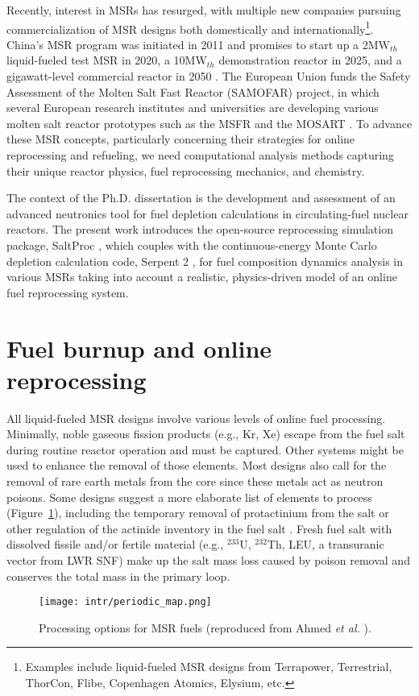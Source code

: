 Recently, interest in \glspl{MSR} has resurged, with multiple new companies 
pursuing commercialization of \gls{MSR} designs both domestically and 
internationally\footnote{Examples include liquid-fueled \gls{MSR} designs from 
Terrapower, Terrestrial, ThorCon, Flibe, Copenhagen Atomics, Elysium, etc.}. 
China's \gls{MSR} program was initiated in 2011 and promises to start up a  
2MW$_{th}$ liquid-fueled test \gls{MSR} in 2020, a 10MW$_{th}$ demonstration 
reactor in 2025, and a gigawatt-level 
commercial reactor in 2050 \cite{zhang_review_2018}. The European 
Union funds the Safety Assessment of the Molten Salt Fast Reactor 
(SAMOFAR) project, in which several European research institutes and 
universities are developing various molten salt reactor prototypes 
such as the \gls{MSFR} \cite{fiorina_molten_2013} and the \gls{MOSART} 
\cite{ignatiev_molten_2014}. To advance these \gls{MSR} concepts, particularly 
concerning their strategies for online reprocessing and refueling, we need 
computational analysis methods capturing their unique reactor 
physics, fuel reprocessing mechanics, and chemistry.

The context of the Ph.D. dissertation is the development and assessment of an 
advanced neutronics tool for fuel depletion calculations in circulating-fuel 
nuclear reactors. The present work introduces the open-source reprocessing 
simulation package, SaltProc \cite{rykhlevskii_arfc/saltproc_2018}, which 
couples with the continuous-energy Monte Carlo depletion calculation code, 
Serpent 2 \cite{leppanen_serpent_2014}, for fuel composition dynamics analysis 
in various \glspl{MSR} taking into account a realistic, physics-driven
model of an online fuel reprocessing system.

\section{Fuel burnup and online reprocessing}\label{sec:litreview}
All liquid-fueled \gls{MSR} designs involve various levels of online fuel 
processing. Minimally, noble gaseous fission products (e.g., Kr, Xe) 
escape from the fuel salt during routine reactor operation and must be 
captured. Other systems might be used to enhance the removal of those 
elements. Most designs also call for the removal of rare earth metals from 
the core since these metals act as neutron poisons. Some designs suggest a 
more elaborate list of elements to process (Figure~\ref{fig:periodic_tab}), 
including the temporary removal of protactinium from the salt or other 
regulation of the actinide inventory in the fuel salt 
\cite{ahmad_neutronics_2015}. Fresh fuel salt with dissolved fissile and/or 
fertile material (e.g., $^{233}$U, $^{232}$Th, \gls{LEU}, a transuranic 
vector from \gls{LWR} \gls{SNF}) make up the salt mass loss caused by poison 
removal and conserves the total mass in the primary loop.
\begin{figure}[htp!] %
	\centering
	\texttt{[image: intr/periodic\_map.png]}
	\caption{Processing options for \gls{MSR} fuels (reproduced from 
		Ahmed \emph{et al.} \cite{ahmad_neutronics_2015}).}
	\label{fig:periodic_tab}
\end{figure}


